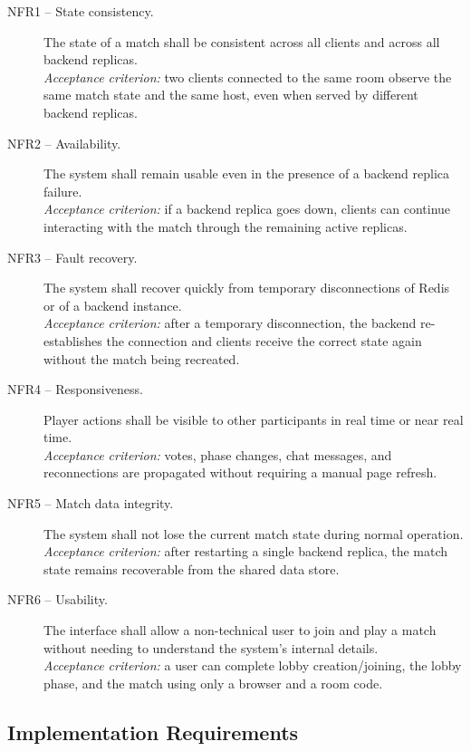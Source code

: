 \documentclass{scrartcl}
\begin{document}
\begin{description}
    \item[NFR1 -- State consistency.] The state of a match shall be consistent across all clients and across all backend replicas.\\
    \textit{Acceptance criterion:} two clients connected to the same room observe the same match state and the same host, even when served by different backend replicas.

    \item[NFR2 -- Availability.] The system shall remain usable even in the presence of a backend replica failure.\\
    \textit{Acceptance criterion:} if a backend replica goes down, clients can continue interacting with the match through the remaining active replicas.

    \item[NFR3 -- Fault recovery.] The system shall recover quickly from temporary disconnections of Redis or of a backend instance.\\
    \textit{Acceptance criterion:} after a temporary disconnection, the backend re-establishes the connection and clients receive the correct state again without the match being recreated.

    \item[NFR4 -- Responsiveness.] Player actions shall be visible to other participants in real time or near real time.\\
    \textit{Acceptance criterion:} votes, phase changes, chat messages, and reconnections are propagated without requiring a manual page refresh.

    \item[NFR5 -- Match data integrity.] The system shall not lose the current match state during normal operation.\\
    \textit{Acceptance criterion:} after restarting a single backend replica, the match state remains recoverable from the shared data store.

    \item[NFR6 -- Usability.] The interface shall allow a non-technical user to join and play a match without needing to understand the system's internal details.\\
    \textit{Acceptance criterion:} a user can complete lobby creation/joining, the lobby phase, and the match using only a browser and a room code.
\end{description}

\subsection{Implementation Requirements}
\end{document}
